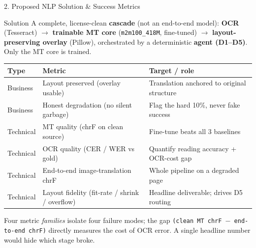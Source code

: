 \documentclass[10pt,aspectratio=169]{beamer}
\begin{document}
\begin{frame}{2. Proposed NLP Solution \& Success Metrics}
\begin{block}{Solution}
A complete, license-clean \textbf{cascade} (not an end-to-end model): \textbf{OCR} (Tesseract) $\rightarrow$ \textbf{trainable MT core} (\texttt{m2m100\_418M}, fine-tuned) $\rightarrow$ \textbf{layout-preserving overlay} (Pillow), orchestrated by a deterministic \textbf{agent (D1--D5)}. Only the MT core is trained.
\end{block}

\begin{table}[h]
\centering\small
\begin{tabular}{lll}
\toprule
\textbf{Type} & \textbf{Metric} & \textbf{Target / role} \\
\midrule
Business & Layout preserved (overlay usable) & Translation anchored to original structure \\
Business & Honest degradation (no silent garbage) & Flag the hard 10\%, never fake success \\
Technical & MT quality (chrF on clean source) & Fine-tune beats all 3 baselines \\
Technical & OCR quality (CER / WER vs gold) & Quantify reading accuracy + OCR-cost gap \\
Technical & End-to-end image-translation chrF & Whole pipeline on a degraded page \\
Technical & Layout fidelity (fit-rate / shrink / overflow) & Headline deliverable; drives D5 routing \\
\bottomrule
\end{tabular}
\end{table}

\scriptsize Four metric \emph{families} isolate four failure modes; the gap \texttt{(clean MT chrF $-$ end-to-end chrF)} directly measures the cost of OCR error. A single headline number would hide which stage broke.
\end{frame}
\end{document}
